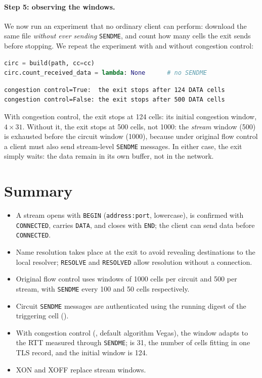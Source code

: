 \paragraph{Step 5: observing the windows.} We now run an experiment that no ordinary client can perform: download the same file \emph{without ever sending} \texttt{SENDME}, and count how many cells the exit sends before stopping. We repeat the experiment with and without congestion control:
\begin{lstlisting}[language=Python]
circ = build(path, cc=cc)
circ.count_received_data = lambda: None      # no SENDME
\end{lstlisting}
\begin{lstlisting}[numbers=none]
congestion control=True:  the exit stops after 124 DATA cells
congestion control=False: the exit stops after 500 DATA cells
\end{lstlisting}
With congestion control, the exit stops at 124 cells: its initial congestion window, $4 \times 31$. Without it, the exit stops at 500 cells, not 1000: the \emph{stream} window (500) is exhausted before the circuit window (1000), because under original flow control a client must also send stream-level \texttt{SENDME} messages. In either case, the exit simply waits: the data remain in its own buffer, not in the network.

\section*{Summary}
\begin{itemize}
  \item A stream opens with \texttt{BEGIN} (\texttt{address:port}, lowercase), is confirmed with \texttt{CONNECTED}, carries \texttt{DATA}, and closes with \texttt{END}; the client can send data before \texttt{CONNECTED}.
  \item Name resolution takes place at the exit to avoid revealing destinations to the local resolver; \texttt{RESOLVE} and \texttt{RESOLVED} allow resolution without a connection.
  \item Original flow control uses windows of 1000 cells per circuit and 500 per stream, with \texttt{SENDME} every 100 and 50 cells respectively.
  \item Circuit \texttt{SENDME} messages are authenticated using the running digest of the triggering cell ().
  \item With congestion control (, default algorithm Vegas), the window adapts to the RTT measured through \texttt{SENDME};  is 31, the number of cells fitting in one TLS record, and the initial window is 124.
  \item XON and XOFF replace stream windows.
\end{itemize}

